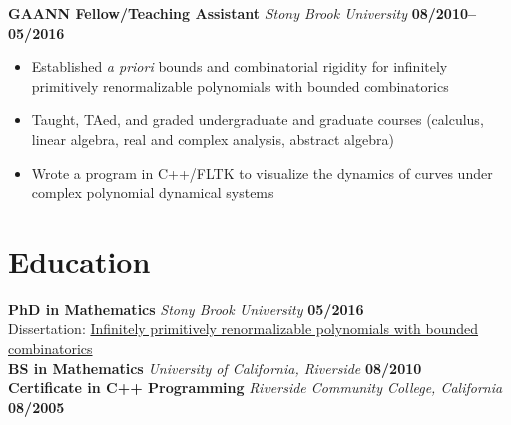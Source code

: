 \documentclass[11pt]{article}
\begin{document}
\vspace{0.5cm}
\noindent\textbf{GAANN Fellow/Teaching Assistant} \emph{Stony Brook University} \hfill \textbf{08/2010--05/2016}
\begin{itemize}
  \itemsep 0em
  \item Established \textit{a priori} bounds and combinatorial rigidity for infinitely primitively renormalizable polynomials with bounded combinatorics
  \item Taught, TAed, and graded undergraduate and graduate courses (calculus, linear algebra, real and complex analysis, abstract algebra)
  \item Wrote a program in C++/FLTK to visualize the dynamics of curves under complex polynomial dynamical systems
\end{itemize}

\section*{Education}
\noindent\textbf{PhD in Mathematics} \emph{Stony Brook University} \hfill \textbf{05/2016}\\
Dissertation: \href{http://hdl.handle.net/11401/76376}{Infinitely primitively renormalizable polynomials with bounded combinatorics}\\
\noindent\textbf{BS in Mathematics} \emph{University of California, Riverside} \hfill \textbf{08/2010}\\
\noindent\textbf{Certificate in C++ Programming} \emph{Riverside Community College, California} \hfill \textbf{08/2005}
\end{document}
